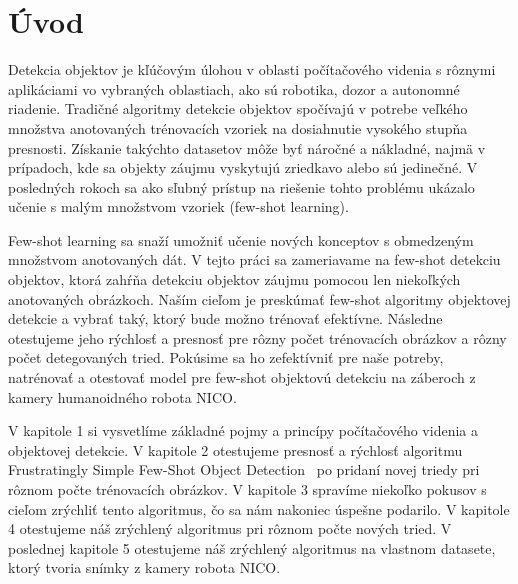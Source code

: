 \chapter*{Úvod}\label{chap:intro}
Detekcia objektov je kľúčovým úlohou v oblasti počítačového videnia s rôznymi aplikáciami vo vybraných oblastiach, ako sú robotika, dozor a autonomné riadenie. Tradičné algoritmy detekcie objektov spočívajú v potrebe veľkého množstva anotovaných trénovacích vzoriek na dosiahnutie vysokého stupňa presnosti. Získanie takýchto datasetov môže byť náročné a nákladné, najmä v prípadoch, kde sa objekty záujmu vyskytujú zriedkavo alebo sú jedinečné. V posledných rokoch sa ako sľubný prístup na riešenie tohto problému ukázalo učenie s malým množstvom vzoriek (few-shot learning).

Few-shot learning sa snaží umožniť učenie nových konceptov s obmedzeným množstvom anotovaných dát. V tejto práci sa zameriavame na few-shot detekciu objektov, ktorá zahŕňa detekciu objektov záujmu pomocou len niekoľkých anotovaných obrázkoch. Naším cieľom je preskúmať few-shot algoritmy objektovej detekcie a vybrať taký, ktorý bude možno trénovať efektívne. Následne otestujeme jeho rýchlosť a presnosť pre rôzny počet trénovacích obrázkov a rôzny počet detegovaných tried. Pokúsime sa ho zefektívniť pre naše potreby, natrénovať a otestovať model pre few-shot objektovú detekciu na záberoch z kamery humanoidného robota NICO. 

V kapitole 1 si vysvetlíme základné pojmy a princípy počítačového videnia a objektovej detekcie. V kapitole 2 otestujeme presnosť a rýchlosť algoritmu Frustratingly Simple Few-Shot Object Detection~\cite{FSFSODT} po pridaní novej triedy pri rôznom počte trénovacích obrázkov. V kapitole 3 spravíme niekoľko pokusov s cieľom zrýchliť tento algoritmus, čo sa nám nakoniec úspešne podarilo. V kapitole 4 otestujeme náš zrýchlený algoritmus pri rôznom počte nových tried. V poslednej kapitole 5 otestujeme náš zrýchlený algoritmus na vlastnom datasete, ktorý tvoria snímky z kamery robota NICO. 

